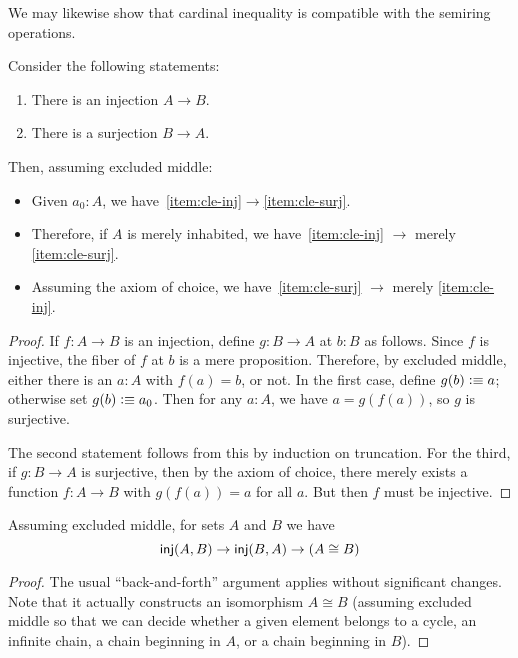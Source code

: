 We may likewise show that cardinal inequality is compatible with the semiring operations.

\begin{lem}\label{thm:injsurj}
  Consider the following statements:
  \begin{enumerate}
  \item There is an injection $A\to B$.\label{item:cle-inj}
  \item There is a surjection $B\to A$.\label{item:cle-surj}
  \end{enumerate}
  Then, assuming excluded middle:
  \begin{itemize}
  \item Given $a_0:A$, we have~\ref{item:cle-inj}$\to$\ref{item:cle-surj}.
  \item Therefore, if $A$ is merely inhabited, we have~\ref{item:cle-inj} $\to$ merely \ref{item:cle-surj}.
  \item Assuming the axiom of choice, we have~\ref{item:cle-surj} $\to$ merely \ref{item:cle-inj}.
  \end{itemize}
\end{lem}
\begin{proof}
  If $f:A\to B$ is an injection, define $g:B\to A$ at $b:B$ as follows.
  Since $f$ is injective, the fiber of $f$ at $b$ is a mere proposition.
  Therefore, by excluded middle, either there is an $a:A$ with $f(a)=b$, or not.
  In the first case, define $g(b)\vcentcolon\equiv a$; otherwise set $g(b)\vcentcolon\equiv a_0$.
  Then for any $a:A$, we have $a = g(f(a))$, so $g$ is surjective.

  The second statement follows from this by induction on truncation.
  For the third, if $g:B\to A$ is surjective, then by the axiom of choice, there merely exists a function $f:A\to B$ with $g(f(a)) = a$ for all $a$.
  But then $f$ must be injective.
\end{proof}

\begin{thm}
  Assuming excluded middle, for sets $A$ and $B$ we have
  \[ \mathsf{inj}(A,B) \to \mathsf{inj}(B,A) \to (A\cong B) \]
\end{thm}
\begin{proof}
  The usual ``back-and-forth'' argument applies without significant changes.
  Note that it actually constructs an isomorphism $A\cong B$ (assuming excluded middle so that we can decide whether a given element belongs to a cycle, an infinite chain, a chain beginning in $A$, or a chain beginning in $B$).
\end{proof}

